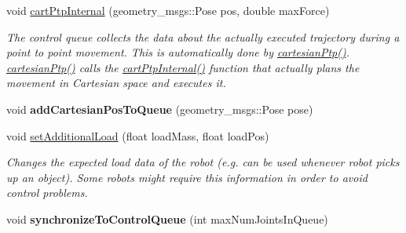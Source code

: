 \begin{DoxyCompactItemize}
\item 
\hypertarget{classkukadu_1_1PlottingControlQueue_afb803b02a1c0f0d7270910583c3d839b}{void \hyperlink{classkukadu_1_1PlottingControlQueue_afb803b02a1c0f0d7270910583c3d839b}{cart\-Ptp\-Internal} (geometry\-\_\-msgs\-::\-Pose pos, double max\-Force)}\label{classkukadu_1_1PlottingControlQueue_afb803b02a1c0f0d7270910583c3d839b}

\begin{DoxyCompactList}\small\item\em The control queue collects the data about the actually executed trajectory during a point to point movement. This is automatically done by \hyperlink{classkukadu_1_1ControlQueue_a1bfa23a8ce6319f6ef0ed9208e896054}{cartesian\-Ptp()}. \hyperlink{classkukadu_1_1ControlQueue_a1bfa23a8ce6319f6ef0ed9208e896054}{cartesian\-Ptp()} calls the \hyperlink{classkukadu_1_1PlottingControlQueue_afb803b02a1c0f0d7270910583c3d839b}{cart\-Ptp\-Internal()} function that actually plans the movement in Cartesian space and executes it. \end{DoxyCompactList}\item 
\hypertarget{classkukadu_1_1PlottingControlQueue_af36df3ed101584adf809c4ebbc70cebc}{void {\bfseries add\-Cartesian\-Pos\-To\-Queue} (geometry\-\_\-msgs\-::\-Pose pose)}\label{classkukadu_1_1PlottingControlQueue_af36df3ed101584adf809c4ebbc70cebc}

\item 
void \hyperlink{classkukadu_1_1PlottingControlQueue_ab6dc63e59f83a1c0ae9fa5b608eb25a4}{set\-Additional\-Load} (float load\-Mass, float load\-Pos)
\begin{DoxyCompactList}\small\item\em Changes the expected load data of the robot (e.\-g. can be used whenever robot picks up an object). Some robots might require this information in order to avoid control problems. \end{DoxyCompactList}\item 
\hypertarget{classkukadu_1_1PlottingControlQueue_a2aff18de1b47aaab576e2e8ceb9bb7bb}{void {\bfseries synchronize\-To\-Control\-Queue} (int max\-Num\-Joints\-In\-Queue)}\label{classkukadu_1_1PlottingControlQueue_a2aff18de1b47aaab576e2e8ceb9bb7bb}


\end{DoxyCompactItemize}

